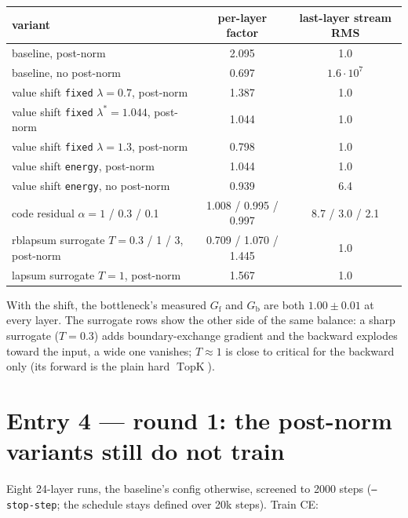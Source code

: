 \documentclass[11pt,a4paper]{article}
\newcommand{\code}[1]{\texttt{#1}}
\newcommand{\Gf}{G_{\mathrm{f}}}
\newcommand{\Gb}{G_{\mathrm{b}}}
\newcommand{\topk}{\operatorname{TopK}}
\begin{document}
\begin{center}\small
\begin{tabular}{lcc}
\toprule
variant & per-layer factor & last-layer stream RMS \\
\midrule
baseline, post-norm & 2.095 & 1.0 \\
baseline, no post-norm & 0.697 & \(1.6\cdot10^{7}\) \\
value shift \code{fixed} \(\lambda=0.7\), post-norm & 1.387 & 1.0 \\
value shift \code{fixed} \(\lambda^\ast=1.044\), post-norm & 1.044 & 1.0 \\
value shift \code{fixed} \(\lambda=1.3\), post-norm & 0.798 & 1.0 \\
value shift \code{energy}, post-norm & 1.044 & 1.0 \\
value shift \code{energy}, no post-norm & 0.939 & 6.4 \\
code residual \(\alpha=1\) / 0.3 / 0.1 & 1.008 / 0.995 / 0.997 & 8.7 / 3.0 / 2.1 \\
rblapsum surrogate \(T=0.3\) / 1 / 3, post-norm & 0.709 / 1.070 / 1.445 & 1.0 \\
lapsum surrogate \(T=1\), post-norm & 1.567 & 1.0 \\
\bottomrule
\end{tabular}
\end{center}

With the shift, the bottleneck's measured \(\Gf\) and \(\Gb\) are both
\(1.00\pm0.01\) at every layer.  The surrogate rows show the other side of the
same balance: a sharp surrogate (\(T=0.3\)) adds boundary-exchange gradient and
the backward explodes toward the input, a wide one vanishes; \(T\approx1\) is
close to critical for the backward only (its forward is the plain hard
\(\topk\)).

\section{Entry 4 --- round 1: the post-norm variants still do not train}

Eight 24-layer runs, the baseline's config otherwise, screened to 2000 steps
(\code{--stop-step}; the schedule stays defined over 20k steps).  Train CE:
\end{document}

